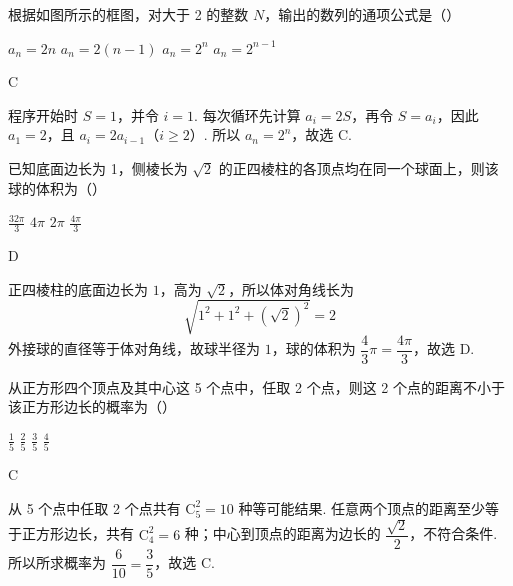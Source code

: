 \begin{problem}
根据如图所示的框图，对大于 2 的整数 \(N\)，输出的数列的通项公式是（\quad）


\choices
    {\(a_{n} = 2n\)}
    {\(a_{n} = 2(n - 1)\)}
    {\(a_{n} = 2^{n}\)}
    {\(a_{n} = 2^{n - 1}\)}
\end{problem}

\begin{answer}
C
\end{answer}

\begin{solution}
程序开始时 \(S=1\)，并令 \(i=1\). 每次循环先计算 \(a_i=2S\)，再令 \(S=a_i\)，因此 \(a_1=2\)，且 \(a_i=2a_{i-1}\)（\(i\geqslant2\)）. 所以 \(a_n=2^n\)，故选 C.
\end{solution}

\begin{problem}
已知底面边长为 1，侧棱长为 \(\sqrt{2}\) 的正四棱柱的各顶点均在同一个球面上，则该球的体积为（\quad）

\choices
    {\(\frac{32\pi}{3}\)}
    {\(4\pi\)}
    {\(2\pi\)}
    {\(\frac{4\pi}{3}\)}
\end{problem}

\begin{answer}
D
\end{answer}

\begin{solution}
正四棱柱的底面边长为 \(1\)，高为 \(\sqrt{2}\)，所以体对角线长为
\[
\sqrt{1^{2}+1^{2}+\left(\sqrt{2}\right)^{2}}=2
\]
外接球的直径等于体对角线，故球半径为 \(1\)，球的体积为 \(\dfrac{4}{3}\pi=\dfrac{4\pi}{3}\)，故选 D.
\end{solution}

\begin{problem}
从正方形四个顶点及其中心这 5 个点中，任取 2 个点，则这 2 个点的距离不小于该正方形边长的概率为（\quad）

\choices
    {\(\frac{1}{5}\)}
    {\( \frac{2}{5} \)}
    {\( \frac{3}{5} \)}
    {\(\frac{4}{5}\)}
\end{problem}

\begin{answer}
C
\end{answer}

\begin{solution}
从 5 个点中任取 2 个点共有 \(\mathrm C_{5}^{2}=10\) 种等可能结果. 任意两个顶点的距离至少等于正方形边长，共有 \(\mathrm C_{4}^{2}=6\) 种；中心到顶点的距离为边长的 \(\dfrac{\sqrt{2}}{2}\)，不符合条件. 所以所求概率为 \(\dfrac{6}{10}=\dfrac{3}{5}\)，故选 C.
\end{solution}


